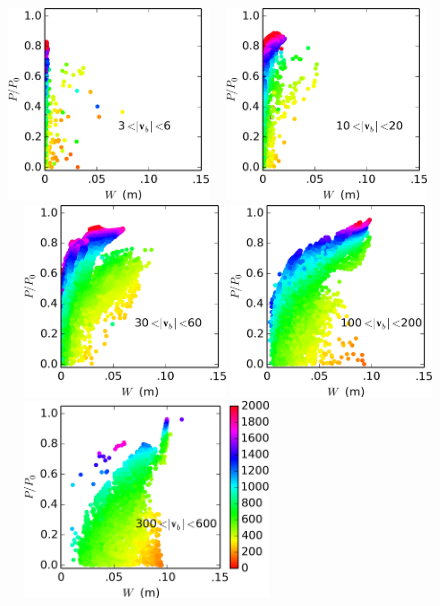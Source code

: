 \documentclass[gmd]{copernicus}   %
\begin{document}
\newcommand{\myheight}{2.0in}
\begin{figure}[ht]
\mbox{\includegraphics[height=\myheight,keepaspectratio=true]{bin1-g2km} \, \includegraphics[height=\myheight,keepaspectratio=true]{bin10-g2km} \, \includegraphics[height=\myheight,keepaspectratio=true]{bin30-g2km}}
\mbox{\includegraphics[height=\myheight,keepaspectratio=true]{bin100-g2km} \,
\includegraphics[height=2.05in,keepaspectratio=true]{bin300-g2km}}

\end{figure}
\end{document}
